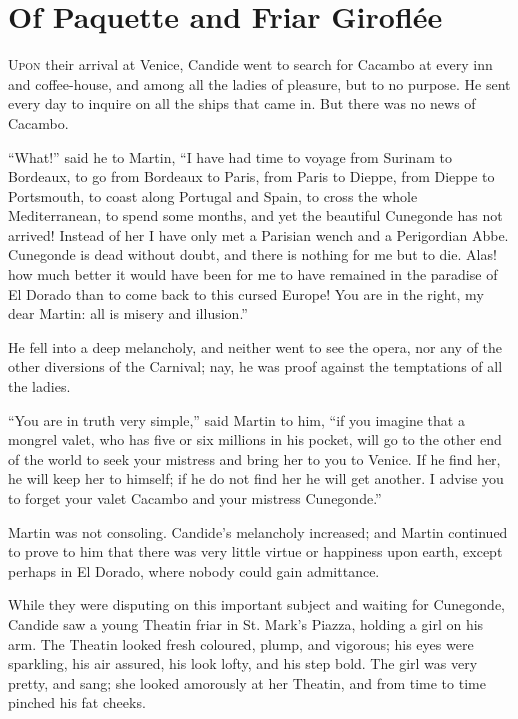 \vspace{1cm}
\begingroup
\let\clearpage\relax
\chapter{Of Paquette and Friar Giroflée}
\thispagestyle{pter}
\endgroup
\vspace{-1cm}
\lettrine[lraise=0.1,nindent=0em,slope=-.5em]{U}{pon} their arrival at Venice, Candide went to search for Cacambo at every inn and coffee-house, and among all the ladies of pleasure, but to no purpose. He sent every day to inquire on all the ships that came in. But there was no news of Cacambo.

``What!'' said he to Martin, ``I have had time to voyage from Surinam to Bordeaux, to go from Bordeaux to Paris, from Paris to Dieppe, from Dieppe to Portsmouth, to coast along Portugal and Spain, to cross the whole Mediterranean, to spend some months, and yet the beautiful Cunegonde has not arrived! Instead of her I have only met a Parisian wench and a Perigordian Abbe. Cunegonde is dead without doubt, and there is nothing for me but to die. Alas! how much better it would have been for me to have remained in the paradise of El Dorado than to come back to this cursed Europe! You are in the right, my dear Martin: all is misery and illusion.''

He fell into a deep melancholy, and neither went to see the opera, nor any of the other diversions of the Carnival; nay, he was proof against the temptations of all the ladies.

``You are in truth very simple,'' said Martin to him, ``if you imagine that a mongrel valet, who has five or six millions in his pocket, will go to the other end of the world to seek your mistress and bring her to you to Venice. If he find her, he will keep her to himself; if he do not find her he will get another. I advise you to forget your valet Cacambo and your mistress Cunegonde.''

Martin was not consoling. Candide's melancholy increased; and Martin continued to prove to him that there was very little virtue or happiness upon earth, except perhaps in El Dorado, where nobody could gain admittance.

While they were disputing on this important subject and waiting for Cunegonde, Candide saw a young Theatin friar in St. Mark's Piazza, holding a girl on his arm. The Theatin looked fresh coloured, plump, and vigorous; his eyes were sparkling, his air assured, his look lofty, and his step bold. The girl was very pretty, and sang; she looked amorously at her Theatin, and from time to time pinched his fat cheeks.

